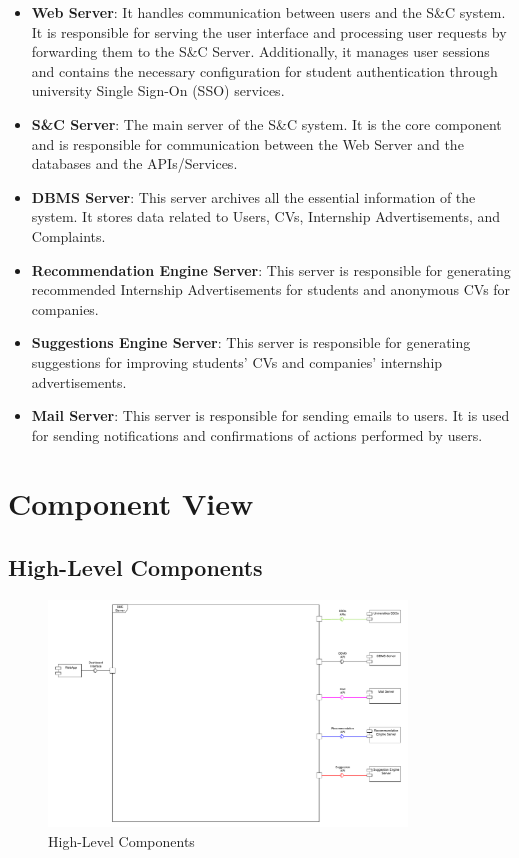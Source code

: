 \begin{itemize}
      \item \textbf{Web Server}: It handles communication between users and the S\&C system. It is responsible for
            serving the user interface and processing user requests by forwarding them to the S\&C Server.
            Additionally, it manages user sessions and contains the necessary configuration for student authentication
            through university Single Sign-On (SSO) services.
      \item \textbf{S\&C Server}: The main server of the S\&C system. It is the core component and is responsible
            for communication between the Web Server and the databases and the APIs/Services.
      \item \textbf{DBMS Server}: This server archives all the essential information of the system.
            It stores data related to Users, CVs, Internship Advertisements, and Complaints.
      \item \textbf{Recommendation Engine Server}: This server is responsible for generating recommended Internship
            Advertisements for students and anonymous CVs for companies.
      \item \textbf{Suggestions Engine Server}: This server is responsible for generating suggestions for improving
            students' CVs and companies' internship advertisements.
      \item \textbf{Mail Server}: This server is responsible for sending emails to users. It is used for sending
            notifications and confirmations of actions performed by users.
\end{itemize}

\section{Component View}
\label{sec:component-view}%

\subsection{High-Level Components}
\label{sub:high-level-components}%

\begin{figure}[H]
      \centering
      \includegraphics[width=0.85\textwidth]{Images/High_Level_Architectural_Design.pdf}
      \caption{High-Level Components}
      \label{fig:high-level-components}
\end{figure}

